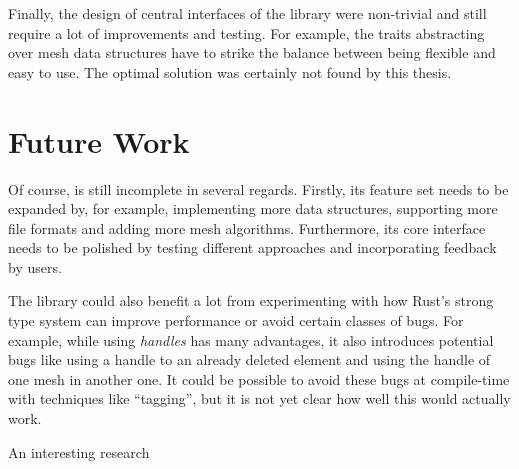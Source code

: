 Finally, the design of central interfaces of the library were non-trivial and still require a lot of improvements and testing.
For example, the traits abstracting over mesh data structures have to strike the balance between being flexible and easy to use.
The optimal solution was certainly not found by this thesis.
\vspace{1cm}

\newpage
\section{Future Work}

Of course,  is still incomplete in several regards.
Firstly, its feature set needs to be expanded by, for example, implementing more data structures, supporting more file formats and adding more mesh algorithms.
Furthermore, its core interface needs to be polished by testing different approaches and incorporating feedback by users.

The library could also benefit a lot from experimenting with how Rust's strong type system can improve performance or avoid certain classes of bugs.
For example, while using \emph{handles} has many advantages, it also introduces potential bugs like using a handle to an already deleted element and using the handle of one mesh in another one.
It could be possible to avoid these bugs at compile-time with techniques like \enquote{tagging}, but it is not yet clear how well this would actually work.

An interesting research



